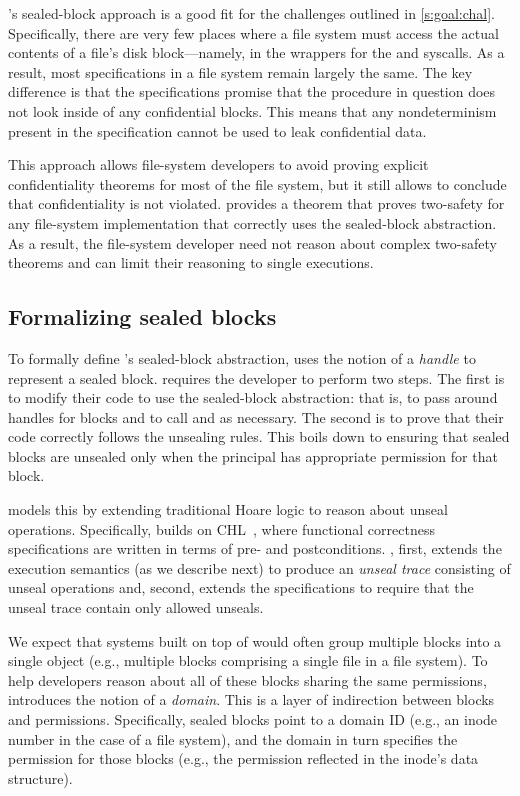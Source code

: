 \sys's sealed-block approach is a good fit for the challenges outlined in
\autoref{s:goal:chal}.  Specifically, there are very few places where a file
system must access the actual contents of a file's disk block---namely, in the
wrappers for the  and  syscalls.  As a result, most
specifications in a file system remain largely the same.  The key difference is
that the specifications promise that the procedure in question does not look
inside of any confidential blocks.  This means that any nondeterminism present
in the specification cannot be used to leak confidential data.

This approach allows file-system developers to avoid proving explicit
confidentiality theorems for most of the file system, but it still allows
\sys to conclude that confidentiality is not violated.  \sys provides a
theorem that proves two-safety for any file-system implementation that
correctly uses the sealed-block abstraction.  As a result, the
file-system developer need not reason about complex two-safety theorems
and can limit their reasoning to single executions.


\subsection{Formalizing sealed blocks}

To formally define \sys's sealed-block abstraction, \sys uses the
notion of a \emph{handle} to represent a sealed block.  \sys requires
the developer to perform two steps.  The first is to modify their code
to use the sealed-block abstraction: that is, to pass around handles
for blocks and to call  and  as necessary.
The second is to prove that their code correctly follows the unsealing
rules.  This boils down to ensuring that sealed blocks are unsealed only
when the principal has appropriate permission for that block.

\sys models this by extending traditional Hoare logic to reason about
unseal operations.  Specifically, \sys builds on CHL~\cite{chen:fscq},
where functional correctness specifications are written in terms of
pre- and postconditions.  \sys, first, extends the execution semantics
(as we describe next) to produce an \emph{unseal trace} consisting of
unseal operations and, second, extends the specifications to require
that the unseal trace contain only allowed unseals.

We expect that systems built on top of \sys would often group multiple
blocks into a single object (e.g., multiple blocks comprising a single
file in a file system).  To help developers reason about all of these
blocks sharing the same permissions, \sys introduces the notion of
a \emph{domain}.  This is a layer of indirection between blocks and
permissions.  Specifically, sealed blocks point to a domain ID (e.g.,
an inode number in the case of a file system), and the domain in turn
specifies the permission for those blocks (e.g., the permission reflected
in the inode's data structure).



